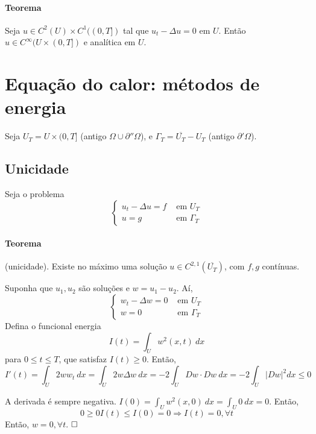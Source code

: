 \documentclass[11pt]{article}
\newcommand{\qed}{$\hfill\square$}
\newcommand{\p}{\partial}
\begin{document}
\paragraph{Teorema} Seja \(u \in C^2 (U) \times C^1((0,T])\) tal que \(u_t - \Delta u =0 \) em \(U\). Então \(u \in C^\infty(U \times (0,T])\) e analítica em \(U\).









\section{Equação do calor: métodos de energia}

Seja \( U_T = U \times (0,T] \) (antigo \( \Omega \cup \p''\Omega \)), e \( \Gamma_T = \overline{U_T} - U_T \) (antigo \( \p'\Omega \)).

\subsection{Unicidade}

Seja o problema \[ \begin{cases}
	u_t - \Delta u = f & \text{ em } U_T\\
	u = g & \text{ em } \Gamma_T
\end{cases} \]

\paragraph{Teorema} (unicidade). Existe no máximo uma solução \( u \in C^{2,1} (\overline{U_T}) \), com \( f,g \) contínuas.

Suponha que \( u_1,u_2 \) são soluções e \( w = u_1 - u_2 \). Aí, \[ \begin{cases}
	w_t - \Delta w = 0 & \text{ em } U_T\\
	w = 0 & \text{ em } \Gamma_T
\end{cases} \]
Defina o funcional energia \[ I(t) = \int_U w^2 (x,t)\ dx \] para \( 0 \leq t \leq T \), que satisfaz \( I(t)\geq 0 \).
Então, \begin{equation*}
	I'(t) = \int_U 2 w w_t\ dx  = \int_U 2 w \Delta w\ dx = - 2 \int_U Dw \cdot Dw\ dx = - 2 \int_U |Dw|^2 dx \leq 0  
\end{equation*}

A derivada é sempre negativa. \( I(0) = \int_U w^2 (x,0)\ dx = \int_U 0\ dx =0 \). Então, \[ 0\geq 0 I(t) \leq I(0) = 0 \Rightarrow I(t)=0, \forall t \]
Então, \( w=0, \forall t \).
\qed
\end{document}
